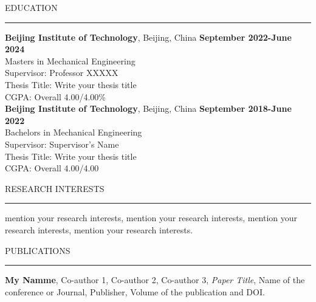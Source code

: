 \documentclass{resume} %
\renewenvironment{rSection}[1]{
\sectionskip
\textcolor{RoyalPurple}{\MakeUppercase{#1}}
\sectionlineskip
\hrule
\begin{list}{}{
\setlength{\leftmargin}{1.5em}
}
\item[]
}{
\end{list}
}
\begin{document}

\begin{rSection}{Education}

{\bf Beijing Institute of Technology}, Beijing, China \hfill \textbf{September 2022-June 2024}\\
Masters in Mechanical Engineering \hfill \\ 
Supervisor: Professor XXXXX \hfill \\
Thesis Title: Write your thesis title\\
CGPA: Overall 4.00/4.00\%  \\

{\bf Beijing Institute of Technology}, Beijing, China  \hfill \textbf{September 2018-June 2022}\\
Bachelors in Mechanical Engineering  \hfill  \\
Supervisor: Supervisor's Name \\
Thesis Title: Write your thesis title \\
CGPA: Overall 4.00/4.00





\begin{rSection}{Research Interests} %
mention your research interests, mention your research interests, mention your research interests, mention your research interests.

\end{rSection}




\begin{rSection}{Publications}
\item \textbf{My Namme}, Co-author 1, Co-author 2, Co-author 3, \textit{Paper Title}, Name of the conference or Journal, Publisher, Volume of the publication and DOI.\\


\end{rSection}
\end{rSection}
\end{document}
